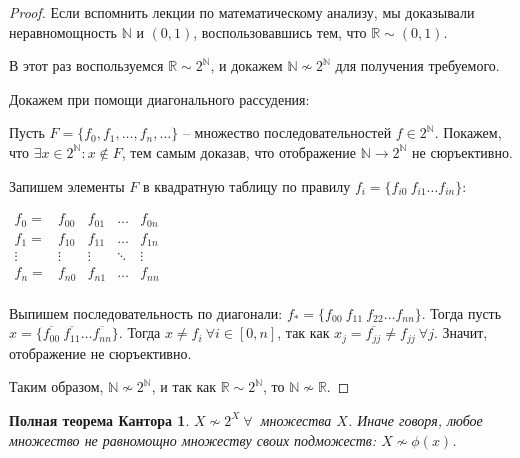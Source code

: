 \documentclass[a4paper, 12pt]{article}
\newtheorem*{cantorfull}{Полная теорема Кантора}
\newcommand{\N}{\mathbb{N}}
\newcommand{\R}{\mathbb{R}}
\begin{document}
\begin{proof}

    Если вспомнить лекции по математическому анализу, мы доказывали неравномощность $\N$ и $(0, 1)$, воспользовавшись тем, что $\R \sim (0, 1)$.

    В этот раз воспользуемся $\R \sim 2^{\N}$, и докажем $\N \nsim 2^{\N}$ для получения требуемого.
    
    Докажем при помощи диагонального рассудения:
    
    Пусть $F = \{f_0, f_1, \ldots , f_n, \ldots \}$ -- множество последовательностей $f \in 2^{\N}$. Покажем, что $\exists x \in 2^{\N} : x \notin F$, тем самым доказав, что отображение $\N \to 2^{\N}$ не сюръективно.
    
    Запишем элементы $F$ в квадратную таблицу по правилу $f_i = \{f_{i0} \ f_{i1} \ldots f_{in}\}$:
    
    $\begin{array}{lcccr}
        f_0 = & f_{00} & f_{01} & \ldots & f_{0n}\\
        f_1 = & f_{10} & f_{11} & \ldots & f_{1n}\\
        \vdots & \vdots & \vdots & \ddots & \vdots \\
        f_n = & f_{n0} & f_{n1} & \ldots & f_{nn}\\
    \end{array}$
    
    Выпишем последовательность по диагонали: $f_{*} = \{f_{00} \ f_{11} \ f_{22} \ldots f_{n n}\}$. Тогда пусть $x = \{\overline{f_{00}} \ \overline{f_{11}} \ldots \overline{f_{n n}}\}$. Тогда $x \neq f_{i} \  \forall i \in [0, n]$, так как $x_{j} = \overline{f_{j j}} \neq f_{j j} \ \forall j$. Значит, отображение не сюръективно.
    
    Таким образом, $\N \nsim 2^{\N}$, и так как $\R \sim 2^{\N}$, то $\N \nsim \R$.
        
\end{proof}
    
\begin{cantorfull}
    $X \nsim 2^{X} \ \forall \ $ множества $X$. Иначе говоря, любое множество не равномощно множеству своих подможеств: $X \nsim \phi(x)$.
\end{cantorfull}
\end{document}
